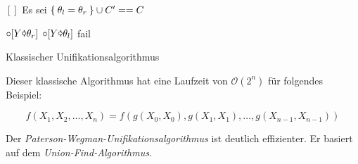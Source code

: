 \begin{algorithm}[h]
    \begin{algorithmic}
            \State \Return $[]$
        \Else
            \State Es sei $\Set{\theta_l = \theta_r} \cup C' == C$

                \State {}
                \State {} $\circ [Y \text{\pointer} \theta_r]$
                \State {} $\circ [Y \text{\pointer} \theta_l]$
                \State {}
            \Else
                \State fail
            \EndIf
        \EndIf
        \EndFunction
    \end{algorithmic}
\caption{Klassischer Unifikationsalgorithmus}
\label{alg:klassischer-unifikationsalgorithmus}
\end{algorithm}

Dieser klassische Algorithmus hat eine Laufzeit von $\mathcal{O}(2^n)$ für folgendes
Beispiel:

\[f(X_1, X_2, \dots, X_n) = f(g(X_0, X_0), g(X_1, X_1), \dots, g(X_{n-1}, X_{n-1}) )\]

Der \textit{Paterson-Wegman-Unifikationsalgorithmus} ist deutlich effizienter.
Er basiert auf dem \textit{Union-Find-Algorithmus}.


